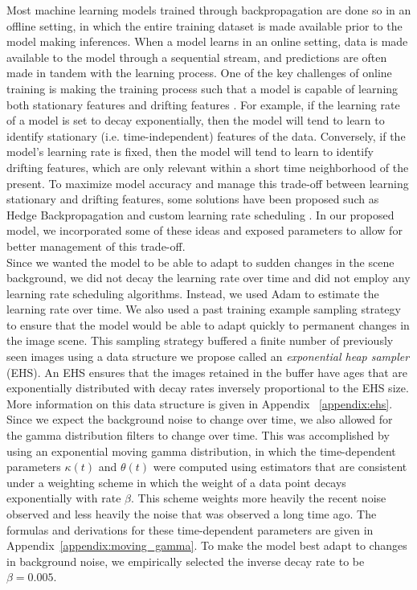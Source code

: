 \documentclass[12pt]{article}
\begin{document}
Most machine learning models trained through backpropagation are done so in an offline setting, in which the entire training dataset is made available prior to the model making inferences. When a model learns in an online setting, data is made available to the model through a sequential stream, and predictions are often made in tandem with the learning process. One of the key challenges of online training is making the training process such that a model is capable of learning both stationary features and drifting features \cite{sahoo_online, zhao_feedback}. For example, if the learning rate of a model is set to decay exponentially, then the model will tend to learn to identify stationary (i.e. time-independent) features of the data. Conversely, if the model's learning rate is fixed, then the model will tend to learn to identify drifting features, which are only relevant within a short time neighborhood of the present. To maximize model accuracy and manage this trade-off between learning stationary and drifting features, some solutions have been proposed such as Hedge Backpropagation \cite{sahoo_online} and custom learning rate scheduling \cite{zhao_feedback}. In our proposed model, we incorporated some of these ideas and exposed parameters to allow for better management of this trade-off.\\

Since we wanted the model to be able to adapt to sudden changes in the scene background, we did not decay the learning rate over time and did not employ any learning rate scheduling algorithms. Instead, we used Adam \cite{adam} to estimate the learning rate over time. We also used a past training example sampling strategy to ensure that the model would be able to adapt quickly to permanent changes in the image scene. This sampling strategy buffered a finite number of previously seen images using a data structure we propose called an \textit{exponential heap sampler} (EHS). An EHS ensures that the images retained in the buffer have ages that are exponentially distributed with decay rates inversely proportional to the EHS size. More information on this data structure is given in Appendix ~\ref{appendix:ehs}.\\

Since we expect the background noise to change over time, we also allowed for the gamma distribution filters to change over time. This was accomplished by using an exponential moving gamma distribution, in which the time-dependent parameters $\kappa(t)$ and $\theta(t)$ were computed using estimators that are consistent under a weighting scheme in which the weight of a data point decays exponentially with rate $\beta$. This scheme weights more heavily the recent noise observed and less heavily the noise that was observed a long time ago. The formulas and derivations for these time-dependent parameters are given in Appendix~\ref{appendix:moving_gamma}. To make the model best adapt to changes in background noise, we empirically selected the inverse decay rate to be $\beta = 0.005$.\\
\end{document}
